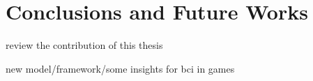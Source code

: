 \chapter{Conclusions and Future Works}\label{ch:conclusions}
review the contribution of this thesis

new model/framework/some insights for bci in games

